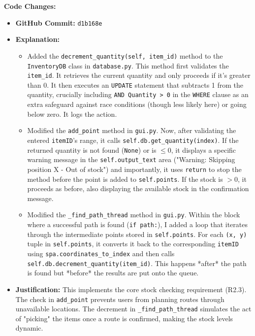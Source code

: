 \textbf{Code Changes:}
\begin{itemize}
	\item \textbf{GitHub Commit:} \verb|d1b168e|
	\item \textbf{Explanation:}
	\begin{itemize}
		\item Added the \verb|decrement_quantity(self, item_id)| method to the \verb|InventoryDB| class in \verb|database.py|. This method first validates the \verb|item_id|. It retrieves the current quantity and only proceeds if it's greater than 0. It then executes an \verb|UPDATE| statement that subtracts 1 from the quantity, crucially including \verb|AND Quantity > 0| in the \verb|WHERE| clause as an extra safeguard against race conditions (though less likely here) or going below zero. It logs the action.
		\item Modified the \verb|add_point| method in \verb|gui.py|. Now, after validating the entered \verb|itemID|'s range, it calls \verb|self.db.get_quantity(index)|. If the returned quantity is not found (\verb|None|) or is $\le 0$, it displays a specific warning message in the \verb|self.output_text| area ("Warning: Skipping position X - Out of stock") and importantly, it uses \verb|return| to stop the method before the point is added to \verb|self.points|. If the stock is $>0$, it proceeds as before, also displaying the available stock in the confirmation message.
		\item Modified the \verb|_find_path_thread| method in \verb|gui.py|. Within the block where a successful path is found (\verb|if path:|), I added a loop that iterates through the intermediate points stored in \verb|self.points|. For each \verb|(x, y)| tuple in \verb|self.points|, it converts it back to the corresponding \verb|itemID| using \verb|spa.coordinates_to_index| and then calls \verb|self.db.decrement_quantity(item_id)|. This happens *after* the path is found but *before* the results are put onto the queue.
	\end{itemize}
	\item \textbf{Justification:} This implements the core stock checking requirement (R2.3). The check in \verb|add_point| prevents users from planning routes through unavailable locations. The decrement in \verb|_find_path_thread| simulates the act of "picking" the items once a route is confirmed, making the stock levels dynamic.
\end{itemize}

